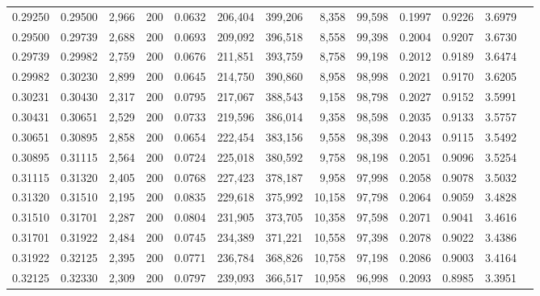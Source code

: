 \begin{tabular}{rrrrrrrrrrrrr}
0.29250 & 0.29500 &  2,966 & 200 &                                     0.0632 & 206,404 & 399,206 &   8,358 &  99,598 & 0.1997 & 0.9226 & 3.6979 \\
0.29500 & 0.29739 &  2,688 & 200 &                                     0.0693 & 209,092 & 396,518 &   8,558 &  99,398 & 0.2004 & 0.9207 & 3.6730 \\
0.29739 & 0.29982 &  2,759 & 200 &                                     0.0676 & 211,851 & 393,759 &   8,758 &  99,198 & 0.2012 & 0.9189 & 3.6474 \\
0.29982 & 0.30230 &  2,899 & 200 &                                     0.0645 & 214,750 & 390,860 &   8,958 &  98,998 & 0.2021 & 0.9170 & 3.6205 \\
0.30231 & 0.30430 &  2,317 & 200 &                                     0.0795 & 217,067 & 388,543 &   9,158 &  98,798 & 0.2027 & 0.9152 & 3.5991 \\
0.30431 & 0.30651 &  2,529 & 200 &                                     0.0733 & 219,596 & 386,014 &   9,358 &  98,598 & 0.2035 & 0.9133 & 3.5757 \\
0.30651 & 0.30895 &  2,858 & 200 &                                     0.0654 & 222,454 & 383,156 &   9,558 &  98,398 & 0.2043 & 0.9115 & 3.5492 \\
0.30895 & 0.31115 &  2,564 & 200 &                                     0.0724 & 225,018 & 380,592 &   9,758 &  98,198 & 0.2051 & 0.9096 & 3.5254 \\
0.31115 & 0.31320 &  2,405 & 200 &                                     0.0768 & 227,423 & 378,187 &   9,958 &  97,998 & 0.2058 & 0.9078 & 3.5032 \\
0.31320 & 0.31510 &  2,195 & 200 &                                     0.0835 & 229,618 & 375,992 &  10,158 &  97,798 & 0.2064 & 0.9059 & 3.4828 \\
0.31510 & 0.31701 &  2,287 & 200 &                                     0.0804 & 231,905 & 373,705 &  10,358 &  97,598 & 0.2071 & 0.9041 & 3.4616 \\
0.31701 & 0.31922 &  2,484 & 200 &                                     0.0745 & 234,389 & 371,221 &  10,558 &  97,398 & 0.2078 & 0.9022 & 3.4386 \\
0.31922 & 0.32125 &  2,395 & 200 &                                     0.0771 & 236,784 & 368,826 &  10,758 &  97,198 & 0.2086 & 0.9003 & 3.4164 \\
0.32125 & 0.32330 &  2,309 & 200 &                                     0.0797 & 239,093 & 366,517 &  10,958 &  96,998 & 0.2093 & 0.8985 & 3.3951 \\

\end{tabular}
